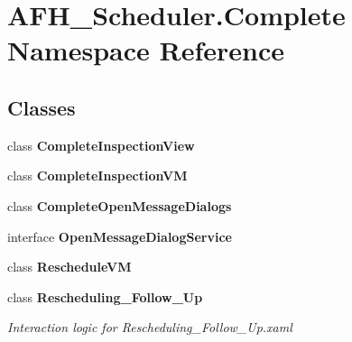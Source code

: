 \section{A\+F\+H\+\_\+\+Scheduler.\+Complete Namespace Reference}
\label{namespace_a_f_h___scheduler_1_1_complete}
\subsection*{Classes}
\begin{DoxyCompactItemize}
\item 
class \textbf{ Complete\+Inspection\+View}
\item 
class \textbf{ Complete\+Inspection\+VM}
\item 
class \textbf{ Complete\+Open\+Message\+Dialogs}
\item 
interface \textbf{ Open\+Message\+Dialog\+Service}
\item 
class \textbf{ Reschedule\+VM}
\item 
class \textbf{ Rescheduling\+\_\+\+Follow\+\_\+\+Up}
\begin{DoxyCompactList}\small\item\em Interaction logic for Rescheduling\+\_\+\+Follow\+\_\+\+Up.\+xaml \end{DoxyCompactList}\end{DoxyCompactItemize}
